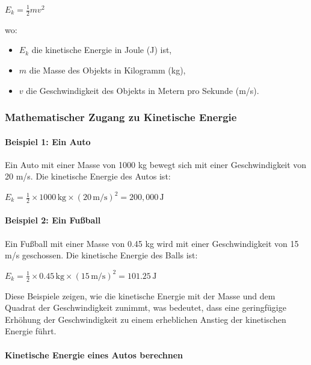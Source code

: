 \documentclass{vorlage-design-main}
\begin{document}
$E_k = \frac{1}{2} m v^2$

wo:

\begin{itemize}

\item
  $E_k$ die kinetische Energie in Joule (J) ist,
\item
  $m$ die Masse des Objekts in Kilogramm (kg),
\item
  $v$ die Geschwindigkeit des Objekts in Metern pro Sekunde (m/s).
\end{itemize}

\hypertarget{mathematischer-zugang-zu-kinetische-energie}{%
\subsubsection{Mathematischer Zugang zu Kinetische
Energie}\label{mathematischer-zugang-zu-kinetische-energie}}

\hypertarget{beispiel-1-ein-auto}{%
\paragraph{Beispiel 1: Ein Auto}\label{beispiel-1-ein-auto}}

Ein Auto mit einer Masse von 1000 kg bewegt sich mit einer
Geschwindigkeit von 20 m/s. Die kinetische Energie des Autos ist:

$E_k = \frac{1}{2} \times 1000 \, \text{kg} \times (20 \, \text{m/s})^2 = 200,000 \, \text{J}$

\hypertarget{beispiel-2-ein-fuuxdfball}{%
\paragraph{Beispiel 2: Ein Fußball}\label{beispiel-2-ein-fussball}}

Ein Fußball mit einer Masse von 0.45 kg wird mit einer Geschwindigkeit
von 15 m/s geschossen. Die kinetische Energie des Balls ist:

$E_k = \frac{1}{2} \times 0.45 \, \text{kg} \times (15 \, \text{m/s})^2 = 101.25 \, \text{J}$

Diese Beispiele zeigen, wie die kinetische Energie mit der Masse und dem
Quadrat der Geschwindigkeit zunimmt, was bedeutet, dass eine
geringfügige Erhöhung der Geschwindigkeit zu einem erheblichen Anstieg
der kinetischen Energie führt.

\hypertarget{kinetische-energie-eines-autos-berechnen}{%
\paragraph{Kinetische Energie eines Autos
berechnen}\label{kinetische-energie-eines-autos-berechnen}}
\end{document}
